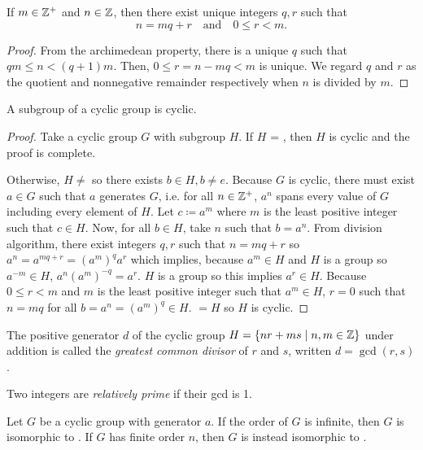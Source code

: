 \begin{theorem}
    If $m\in\mathbb{Z}^+$ and $n\in\mathbb{Z}$, then there exist unique integers $q,r$ such that $$n=mq+r \quad\text{and}\quad 0\leq r<m.$$
\end{theorem}
\begin{proof}
    From the archimedean property, there is a unique $q$ such that $qm\leq n < (q+1)m$. Then, $0 \leq r = n - mq < m$ is unique. We regard $q$ and $r$ as the quotient and nonnegative remainder respectively when $n$ is divided by $m$.
\end{proof}
\begin{theorem}
    A subgroup of a cyclic group is cyclic.
\end{theorem}
\begin{proof}
    Take a cyclic group $G$ with subgroup $H$. If $H$ = , then $H$ is cyclic and the proof is complete.

    Otherwise, $H \neq$  so there exists $b \in H, b \neq e$. Because $G$ is cyclic, there must exist $a \in G$ such that $a$ generates $G$, i.e. for all $n \in \mathbb{Z}^+$, $a^n$ spans every value of $G$ including every element of $H$. Let $c \coloneq a^m$ where $m$ is the least positive integer such that $c \in H$. Now, for all $b \in H$, take $n$ such that $b = a^n$. From division algorithm, there exist integers $q,r$ such that $n = mq+r$ so $a^n = a^{mq+r} = (a^m)^qa^r$ which implies, because $a^{m} \in H$ and $H$ is a group so $a^{-m} \in H$, $a^n(a^m)^{-q}=a^r$. $H$ is a group so this implies $a^r \in H$. Because $0 \leq r < m$ and $m$ is the least positive integer such that $a^m \in H$, $r=0$ such that $n = mq$ for all $b=a^n = (a^m)^q \in H$.  $= H$ so $H$ is cyclic.
\end{proof}
\begin{definition}
    The positive generator $d$ of the cyclic group $H = \{nr+ms \mid n,m \in \mathbb{Z}\}$ under addition is called the \emph{greatest common divisor} of $r$ and $s$, written $d = \gcd(r,s)$.
\end{definition}
\begin{definition}
    Two integers are \emph{relatively prime} if their gcd is 1.
\end{definition}
\begin{theorem}
    Let $G$ be a cyclic group with generator $a$. If the order of $G$ is infinite, then $G$ is isomorphic to \group{\Z}{+}. If $G$ has finite order $n$, then $G$ is instead isomorphic to .
\end{theorem}
